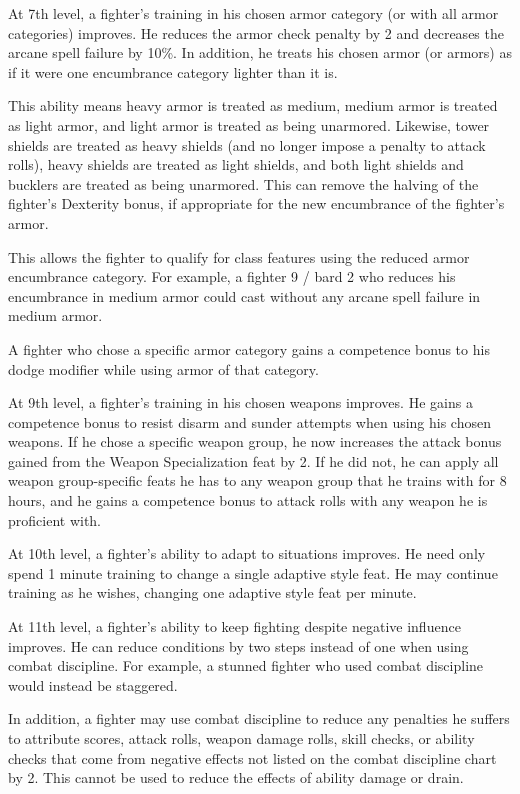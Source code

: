  At 7th level, a fighter's training in his chosen armor category (or with all armor categories) improves. He reduces the armor check penalty by 2 and decreases the arcane spell failure by 10\%. In addition, he treats his chosen armor (or armors) as if it were one encumbrance category lighter than it is.
\par This ability means heavy armor is treated as medium, medium armor is treated as light armor, and light armor is treated as being unarmored. Likewise, tower shields are treated as heavy shields (and no longer impose a  penalty to attack rolls), heavy shields are treated as light shields, and both light shields and bucklers are treated as being unarmored. This can remove the halving of the fighter's Dexterity bonus, if appropriate for the new encumbrance of the fighter's armor.
\par This allows the fighter to qualify for class features using the reduced armor encumbrance category. For example, a fighter 9 / bard 2 who reduces his encumbrance in medium armor could cast without any arcane spell failure in medium armor.
\par A fighter who chose a specific armor category gains a  competence bonus to his dodge modifier while using armor of that category.

 At 9th level, a fighter's training in his chosen weapons improves. He gains a  competence bonus to resist disarm and sunder attempts when using his chosen weapons. If he chose a specific weapon group, he now increases the attack bonus gained from the Weapon Specialization feat by 2. If he did not, he can apply all weapon group-specific feats he has to any weapon group that he trains with for 8 hours, and he gains a  competence bonus to attack rolls with any weapon he is proficient with.

 At 10th level, a fighter's ability to adapt to situations improves. He need only spend 1 minute training to change a single adaptive style feat. He may continue training as he wishes, changing one adaptive style feat per minute.

 At 11th level, a fighter's ability to keep fighting despite negative influence improves. He can reduce conditions by two steps instead of one when using combat discipline. For example, a stunned fighter who used combat discipline would instead be staggered.
\par In addition, a fighter may use combat discipline to reduce any penalties he suffers to attribute scores, attack rolls, weapon damage rolls, skill checks, or ability checks that come from negative effects not listed on the combat discipline chart by 2. This cannot be used to reduce the effects of ability damage or drain.

